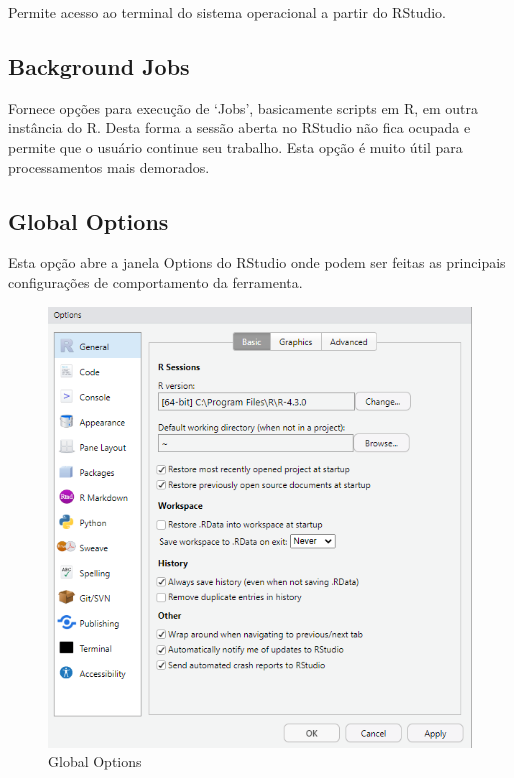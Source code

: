 \documentclass[
  letterpaper,
  DIV=11,
  numbers=noendperiod]{scrreprt}
\begin{document}
Permite acesso ao terminal do sistema operacional a partir do RStudio.

\hypertarget{background-jobs}{%
\subsection{Background Jobs}\label{background-jobs}}

Fornece opções para execução de `Jobs', basicamente scripts em R, em
outra instância do R. Desta forma a sessão aberta no RStudio não fica
ocupada e permite que o usuário continue seu trabalho. Esta opção é
muito útil para processamentos mais demorados.

\hypertarget{global-options}{%
\subsection{Global Options}\label{global-options}}

Esta opção abre a janela Options do RStudio onde podem ser feitas as
principais configurações de comportamento da ferramenta.

\begin{figure}

{\centering \includegraphics{./images/rstudio/menu_tools_global_options.png}

}

\caption{\label{fig-rstudio-menu-global-options}Global Options}

\end{figure}
\end{document}
